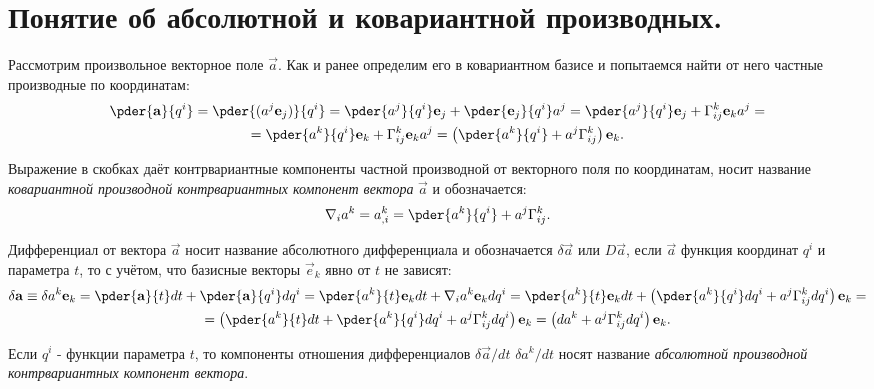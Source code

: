 \chapter{Понятие об абсолютной и ковариантной производных.}

Рассмотрим произвольное векторное поле \( \vec{a} \). Как и ранее определим его
в ковариантном базисе и попытаемся найти от него частные производные по
координатам:
\begin{gather*}
    \pder{\vec{a}}{q^i} = 
    \pder{(a^j \vec{e}_{j})}{q^i} = 
    \pder{a^j}{q^i}\vec{e}_{j} + \pder{ \vec{e}_{j}}{q^i} a^j =
    \pder{a^j}{q^i}\vec{e}_{j} + \Gamma^k_{ij} \vec{e}_{k} a^j =\\=
    \pder{a^k}{q^i}\vec{e}_{k} + \Gamma^k_{ij} \vec{e}_{k} a^j =
    \left(\pder{a^k}{q^i} + a^j \Gamma^k_{ij}\right)\vec{e}_{k}.
\end{gather*}

Выражение в скобках даёт контрвариантные компоненты частной производной от
векторного поля по координатам, носит название \emph{ковариантной производной
контрвариантных компонент вектора } \( \vec{a} \) и обозначается:
\[
    \nabla_i a^k = a^k_{,i} = \pder{a^k}{q^i} + a^j \Gamma^k_{ij}.
\]
    
Дифференциал от вектора \( \vec{a} \) носит название абсолютного дифференциала
и обозначается \( \delta  \vec{a} \) или \( D  \vec{a} \), если \( \vec{a} \)
функция координат \( q^i \) и параметра \( t \), то с учётом, что базисные
векторы \( \vec{e}_{k} \) явно от \( t \) не зависят:
\begin{gather*}
    \delta  \vec{a} \equiv \delta a^k \vec{e}_{k}= 
    \pder{\vec{a}}{t} dt + \pder{ \vec{a}}{q^i} dq^i = 
    \pder{a^k}{t} \vec{e}_{k} dt  + \nabla_i a^k \vec{e}_{k} dq^i =
    \pder{a^k}{t}\vec{e}_{k} dt  + \left(\pder{a^k}{q^i}dq^i +
    a^j \Gamma^k_{ij} dq^i\right) \vec{e}_{k} = \\ =
    \left(\pder{a^k}{t} dt+\pder{a^k}{q^i}dq^i +
    a^j \Gamma^k_{ij} dq^i\right) \vec{e}_{k} = 
    \left(d{a^k} + a^j \Gamma^k_{ij} dq^i\right) \vec{e}_{k}.
\end{gather*}
    
Если \( q^i \) - функции параметра \( t \), то компоненты отношения
дифференциалов \( \delta\vec{a}/dt \) \( \delta a^k/dt \) носят название
\emph{абсолютной производной контрвариантных компонент вектора}.

\newpage
